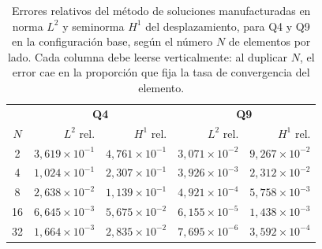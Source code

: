 \begin{table}[htbp]
\centering
\caption[Errores relativos del MMS en norma $L^2$ y seminorma $H^1$ del desplazamiento.]{Errores relativos del método de soluciones manufacturadas en norma $L^2$ y seminorma $H^1$ del desplazamiento, para Q4 y Q9 en la configuración base, según el número $N$ de elementos por lado. Cada columna debe leerse verticalmente: al duplicar $N$, el error cae en la proporción que fija la tasa de convergencia del elemento.}
\label{tab:mms-rel}
\begin{tabular}{c r r r r}
\hline
 & \multicolumn{2}{c}{\textbf{Q4}} & \multicolumn{2}{c}{\textbf{Q9}} \\
$N$ & $L^2$ rel. & $H^1$ rel. & $L^2$ rel. & $H^1$ rel. \\
\hline
2  & $3{,}619\times10^{-1}$ & $4{,}761\times10^{-1}$ & $3{,}071\times10^{-2}$ & $9{,}267\times10^{-2}$ \\
4  & $1{,}024\times10^{-1}$ & $2{,}307\times10^{-1}$ & $3{,}926\times10^{-3}$ & $2{,}312\times10^{-2}$ \\
8  & $2{,}638\times10^{-2}$ & $1{,}139\times10^{-1}$ & $4{,}921\times10^{-4}$ & $5{,}758\times10^{-3}$ \\
16 & $6{,}645\times10^{-3}$ & $5{,}675\times10^{-2}$ & $6{,}155\times10^{-5}$ & $1{,}438\times10^{-3}$ \\
32 & $1{,}664\times10^{-3}$ & $2{,}835\times10^{-2}$ & $7{,}695\times10^{-6}$ & $3{,}592\times10^{-4}$ \\
\hline
\end{tabular}
\end{table}

